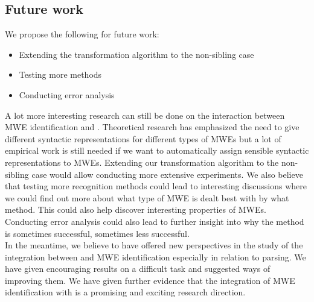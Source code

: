 \documentclass[output=paper]{langsci/langscibook}
\begin{document}
\subsection{Future work}
We propose the following for future work:
\begin{itemize}
    \setlength\itemsep{0pt}
    \item Extending the transformation algorithm to the non-sibling case
    \item Testing more  methods
    \item Conducting error analysis
\end{itemize}
A lot more interesting research can still be done on the interaction between MWE identification and . Theoretical research has emphasized the need to give different syntactic representations for different types of MWEs but a lot of empirical work is still needed if we want to automatically assign sensible syntactic representations to MWEs. Extending our transformation algorithm to the non-sibling case would allow conducting more extensive experiments. We also believe that testing more recognition methods could lead to interesting discussions where we could find out more about what type of MWE is dealt best with by what method. This could also help discover interesting properties of MWEs. Conducting error analysis could also lead to further insight into why the method is sometimes successful, sometimes less successful. \\
\indent In the meantime, we believe to have offered new perspectives in the study of the integration between  and MWE identification especially in relation to  parsing. We have given encouraging results on a difficult task and suggested ways of improving them. We have given further evidence that the integration of MWE identification with  is a promising and exciting research direction.
 
{\sloppy\printbibliography[heading=subbibliography,notkeyword=this]}
\end{document}
